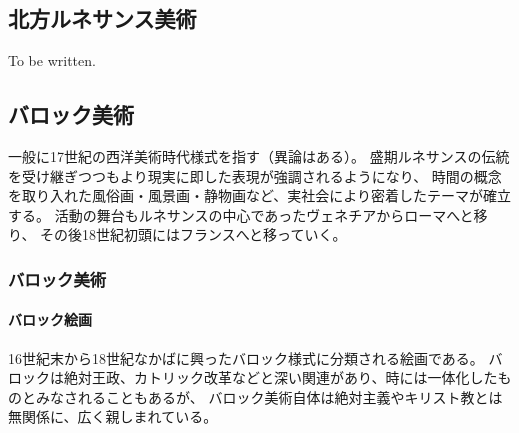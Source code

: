 \documentclass[letterpaper,10pt,dvipdfmx]{sphinxmanual}
\begin{document}
\subsection{北方ルネサンス美術}
\label{\detokenize{category:id19}}
To be written.


\subsection{バロック美術}
\label{\detokenize{category:id20}}
一般に17世紀の西洋美術時代様式を指す（異論はある）。
盛期ルネサンスの伝統を受け継ぎつつもより現実に即した表現が強調されるようになり、
時間の概念を取り入れた風俗画・風景画・静物画など、実社会により密着したテーマが確立する。
活動の舞台もルネサンスの中心であったヴェネチアからローマへと移り、
その後18世紀初頭にはフランスへと移っていく。


\subsubsection{バロック美術}
\label{\detokenize{Baroque:id1}}\label{\detokenize{Baroque::doc}}

\paragraph{バロック絵画}
\label{\detokenize{Baroque:id2}}
16世紀末から18世紀なかばに興ったバロック様式に分類される絵画である。
バロックは絶対王政、カトリック改革などと深い関連があり、時には一体化したものとみなされることもあるが、
バロック美術自体は絶対主義やキリスト教とは無関係に、広く親しまれている。
\end{document}
